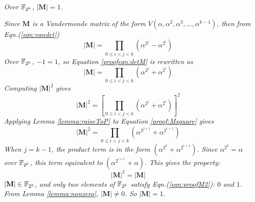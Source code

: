 \begin{Lemma}\label{lemma:MIs1}
{\it Over ${\mathbb{F}}_{2^k}$, $|\mathbf{M}|=1$.}
\end{Lemma}
\begin{Proof}
{\it Since $\mathbf{M}$ is a Vandermonde matrix of the form $V(\alpha,\alpha^2,\alpha^3,\dots,\alpha^{k-1})$, 
then from Eqn.(\ref{eqn:vandet})
\begin{equation}
|\mathbf{M}| = \prod\limits_{0\leq i < j < k}(\alpha^{2^j}-\alpha^{2^i}) \label{proofeqn:detM}
\end{equation}
Over ${\mathbb{F}}_{2^k}$, $-1=1$, so Equation \ref{proofeqn:detM} is rewritten as
\begin{equation}
|\mathbf{M}| = \prod\limits_{0\leq i < j < k}(\alpha^{2^j}+\alpha^{2^i}) \label{proofeqn:detMrewrite}
\end{equation}
Computing $|\mathbf{M}|^2$ gives
\begin{equation} \label{proof:Msquare}
|\mathbf{M}|^2 = [\prod\limits_{0\leq i < j < k}(\alpha^{2^j}+\alpha^{2^i})]^2
\end{equation}
Applying Lemma \ref{lemma:raiseToP} to Equation \ref{proof:Msquare} gives
\begin{equation}
|\mathbf{M}|^2 = \prod\limits_{0\leq i < j < k}(\alpha^{2^{j+1}}+\alpha^{2^{i+1}})
\end{equation}
When $j=k-1$, the product term is in the form $(\alpha^{2^k}+\alpha^{2^{i+1}})$. 
Since $\alpha^{2^k}=\alpha$ over ${\mathbb{F}}_{2^k}$, this term equivalent to  $(\alpha^{2^{i+1}}+\alpha)$.
This gives the property:
\begin{equation}
|\mathbf{M}|^2=|\mathbf{M}|\label{eqn:proofM2}
\end{equation}
$|\mathbf{M}|\in {\mathbb{F}}_{2^k}$, and only two elements of ${\mathbb{F}}_{2^k}$ satisfy Eqn.(\ref{eqn:proofM2}): 
$0$ and $1$. From Lemma \ref{lemma:nonzero}, $|\mathbf{M}|\neq 0$. So $|\mathbf{M}|=1$.}
\end{Proof}

